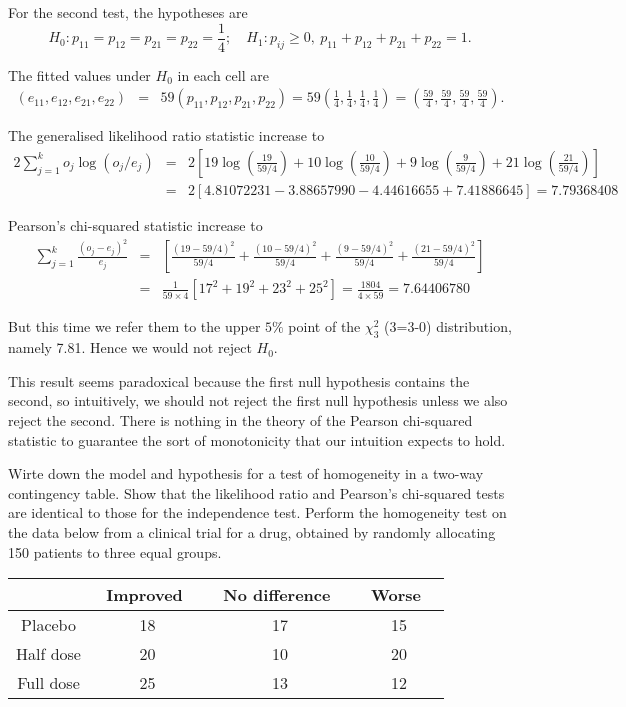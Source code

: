 For the second test, the hypotheses are
\begin{equation}
H_0: p_{11}=p_{12}=p_{21}=p_{22} = \frac 14; \quad H_1: p_{ij}\geq 0,\ p_{11} + p_{12} + p_{21} + p_{22} =1.
\end{equation}

The fitted values under $H_0$ in each cell are
\begin{eqnarray}
(e_{11},e_{12},e_{21},e_{22}) & = & 59\left(p_{11},p_{12},p_{21},p_{22} \right) =  59\left(\frac 14, \frac 14, \frac 14, \frac 14\right) = \left(\frac{59}{4},\frac{59}{4},\frac{59}{4},\frac{59}{4}\right).
\end{eqnarray}

The generalised likelihood ratio statistic increase to
\begin{eqnarray}
2\sum^k_{j=1}o_j\log(o_j/e_j) & = & 2\left[19\log\left(\frac{19}{59/4}\right) + 10\log\left(\frac{10}{59/4}\right) + 9\log\left(\frac{9}{59/4}\right) + 21\log\left(\frac{21}{59/4}\right)\right] \nonumber\\
& = & 2\left[4.81072231 - 3.88657990 - 4.44616655 + 7.41886645 \right] = 7.79368408
\end{eqnarray}

Pearson's chi-squared statistic increase to
\begin{eqnarray}
\sum^k_{j=1}\frac{(o_j-e_j)^2}{e_j} & = & \left[\frac{(19-59/4)^2}{59/4} + \frac{(10-59/4)^2}{59/4} + \frac{(9-59/4)^2}{59/4} + \frac{(21-59/4)^2}{59/4}\right]\nonumber\\
& = & \frac{1}{59\times 4}\left[17^2 + 19^2 + 23^2 + 25^2\right] = \frac{1804}{4\times 59} = 7.64406780
\end{eqnarray}

But this time we refer them to the upper $5\%$ point of the $\chi_3^2$ (3=3-0) distribution, namely 7.81. Hence we would not reject $H_0$.

This result seems paradoxical because the first null hypothesis contains the second, so intuitively, we should not reject the first null hypothesis unless we also reject the second. There is nothing in the theory of the Pearson chi-squared statistic to guarantee the sort of monotonicity that our intuition expects to hold.





\item Wirte down the model and hypothesis for a test of homogeneity in a two-way contingency table. Show that the likelihood ratio and Pearson's chi-squared tests are identical to those for the independence test. Perform the homogeneity test on the data below from a clinical trial for a drug, obtained by randomly allocating 150 patients to three equal groups.
\begin{center}
\begin{tabular}{cccc}
 & \ Improved \  & \ No difference \  & \ Worse \ \\ \hline
Placebo & 18  & 17 & 15  \\
Half dose & 20  & 10 & 20 \\
Full dose & 25 & 13 & 12
\end{tabular}
\end{center}



